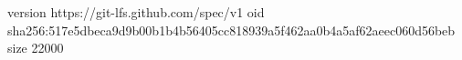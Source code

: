 version https://git-lfs.github.com/spec/v1
oid sha256:517e5dbeca9d9b00b1b4b56405cc818939a5f462aa0b4a5af62aeec060d56beb
size 22000
